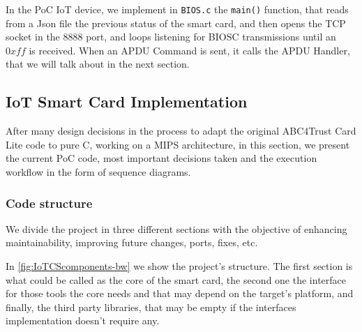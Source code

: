 \documentclass[journal]{IEEEtran}
\begin{document}

\hfil


In the PoC IoT device, we implement in \texttt{BIOS.c} the \texttt{main()} function, that reads from a Json file the previous status of the smart card, and then opens the TCP socket in the $8888$ port, and loops listening for BIOSC transmissions until an $0xff$ is received. When an APDU Command is sent, it calls the APDU Handler, that we will talk about in the next section.




\subsection{IoT Smart Card Implementation}


After many design decisions in the process to adapt the original ABC4Trust Card Lite code to pure C, working on a MIPS architecture, in this section, we present the current \ac{PoC} code, most important decisions taken and the execution workflow in the form of sequence diagrams.


\hfil



\subsubsection{Code structure}


We divide the project in three different sections with the objective of enhancing maintainability, improving future changes, ports, fixes, etc.

In \autoref{fig:IoTCScomponents-bw} we show the project's structure. The first section is what could be called as the core of the smart card, the second one the interface for those tools the core needs and that may depend on the target's platform, and finally, the third party libraries, that may be empty if the interfaces implementation doesn't require any.




\end{document}
